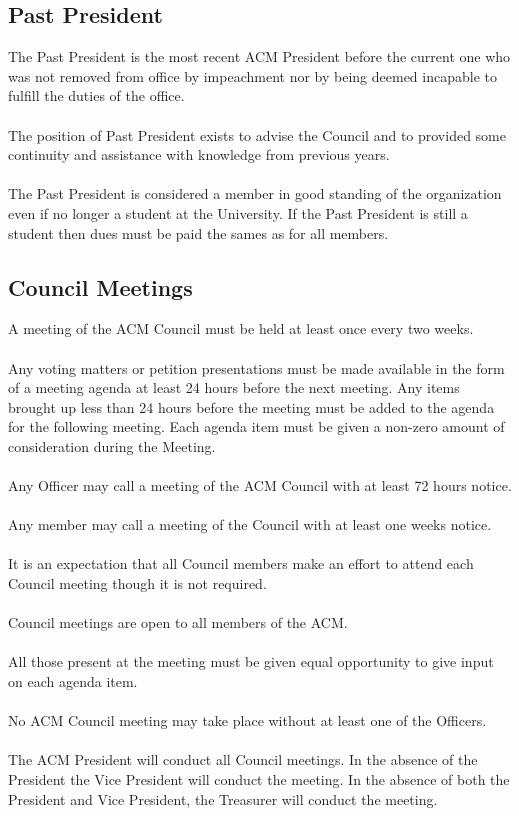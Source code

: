 \documentclass[12pt,titlepage]{article}
\begin{document}
\subsection{Past President}

The Past President is the most recent ACM President before the current one who was not removed from office by impeachment nor by being deemed incapable to fulfill the duties of the office.\\
\\
The position of Past President exists to advise the Council and to provided some continuity and assistance with knowledge from previous years.\\
\\
The Past President is considered a member in good standing of the organization even if no longer a student at the University. If the Past President is still a student then dues must be paid the sames as for all members.

\subsection{Council Meetings}

A meeting of the ACM Council must be held at least once every two weeks.\\
\\
Any voting matters or petition presentations must be made available in the form of a meeting agenda at least 24 hours before the next meeting. Any items brought up less than 24 hours before the meeting must be added to the agenda for the following meeting. Each agenda item must be given a non-zero amount of consideration during the Meeting.\\
\\
Any Officer may call a meeting of the ACM Council with at least 72 hours notice.\\
\\
Any member may call a meeting of the Council with at least one weeks notice.\\
\\
It is an expectation that all Council members make an effort to attend each Council meeting though it is not required.\\
\\
Council meetings are open to all members of the ACM.\\
\\
All those present at the meeting must be given equal opportunity to give input on each agenda item.\\
\\
No ACM Council meeting may take place without at least one of the Officers.\\
\\
The ACM President will conduct all Council meetings. In the absence of the President the Vice President will conduct the meeting. In the absence of both the President and Vice President, the Treasurer will conduct the meeting.
\end{document}
